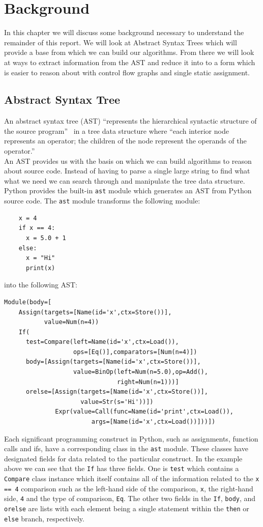\documentclass[12pt, titlepage]{article}
\begin{document}
\newpage
\section{Background}
\label{chap:background}
In this chapter we will discuss some background necessary to understand the remainder of this report. We will look at Abstract Syntax Trees which will provide a base from which we can build our algorithms. From there we will look at ways to extract information from the AST and reduce it into to a form which is easier to reason about with control flow graphs and single static assignment.

\subsection{Abstract Syntax Tree}
An abstract syntax tree (AST) ``represents the hierarchical syntactic structure of the source 
program''~\cite{dragonBook} in a tree data structure where ``each 
interior node represents an operator; the children of the node represent the 
operands of the operator.''~\cite{dragonBook} \\
\indent An AST provides us with the basis on which we can build algorithms to reason about source code. Instead of having to parse a single large string to find what what we need we can search through and manipulate the tree data structure. \\
\indent Python provides the built-in \texttt{ast} module which generates an AST from Python source code. The \texttt{ast} module transforms the following module:
\begin{lstlisting}
    x = 4
    if x == 4:
      x = 5.0 + 1
    else:
      x = "Hi"
      print(x)
\end{lstlisting}
into the following AST:
\begin{verbatim}
Module(body=[
    Assign(targets=[Name(id='x',ctx=Store())],
           value=Num(n=4))
    If(
      test=Compare(left=Name(id='x',ctx=Load()),
                   ops=[Eq()],comparators=[Num(n=4)])
      body=[Assign(targets=[Name(id='x',ctx=Store())],
                   value=BinOp(left=Num(n=5.0),op=Add(),
                               right=Num(n=1)))]
      orelse=[Assign(targets=[Name(id='x',ctx=Store())],
                     value=Str(s='Hi'))])
              Expr(value=Call(func=Name(id='print',ctx=Load()),
                        args=[Name(id='x',ctx=Load())]))])
\end{verbatim}
Each significant programming construct in Python, such as assignments, function calls and ifs, have a corresponding class in the \texttt{ast} module. These classes have designated fields for data related to the particular construct. In the example above we can see that the \texttt{If} has three fields. One is \texttt{test} which contains a \texttt{Compare} class instance which itself contains all of the information related to the \texttt{x == 4} comparison such as the left-hand side of the comparison, \texttt{x}, the right-hand side, \texttt{4} and the type of comparison, \texttt{Eq}. The other two fields in the \texttt{If}, \texttt{body}, and \texttt{orelse} are lists with each element being a single statement within the \texttt{then} or \texttt{else} branch, respectively. \\
\end{document}
